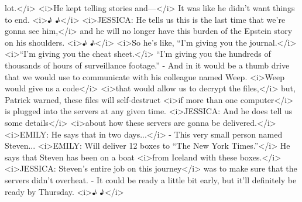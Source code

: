 \begin{itemize}
  lot.\textless{}/i\textgreater{} \textless{}i\textgreater{}He kept
  telling stories and---\textless{}/i\textgreater{} It was like he
  didn't want things to end. \textless{}i\textgreater{}♪
  ♪\textless{}/i\textgreater{} \textless{}i\textgreater{}JESSICA: He
  tells us this is the last time that we're gonna see
  him,\textless{}/i\textgreater{} and he will no longer have this burden
  of the Epstein story on his shoulders. \textless{}i\textgreater{}♪
  ♪\textless{}/i\textgreater{} \textless{}i\textgreater{}So he's like,
  ``I'm giving you the journal.\textless{}/i\textgreater{}
  \textless{}i\textgreater{}``I'm giving you the cheat
  sheet.\textless{}/i\textgreater{} ``I'm giving you the hundreds of
  thousands of hours of surveillance footage.'' - And in it would be a
  thumb drive that we would use to communicate with his colleague named
  Weep. \textless{}i\textgreater{}Weep would give us a
  code\textless{}/i\textgreater{} \textless{}i\textgreater{}that would
  allow us to decrypt the files,\textless{}/i\textgreater{} but, Patrick
  warned, these files will self-destruct \textless{}i\textgreater{}if
  more than one computer\textless{}/i\textgreater{} is plugged into the
  servers at any given time. \textless{}i\textgreater{}JESSICA: And he
  does tell us some details\textless{}/i\textgreater{}
  \textless{}i\textgreater{}about how these servers are gonna be
  delivered.\textless{}/i\textgreater{} \textless{}i\textgreater{}EMILY:
  He says that in two days...\textless{}/i\textgreater{} - This very
  small person named Steven... \textless{}i\textgreater{}EMILY: Will
  deliver 12 boxes to ``The New York Times.''\textless{}/i\textgreater{}
  He says that Steven has been on a boat \textless{}i\textgreater{}from
  Iceland with these boxes.\textless{}/i\textgreater{}
  \textless{}i\textgreater{}JESSICA: Steven's entire job on this
  journey\textless{}/i\textgreater{} was to make sure that the servers
  didn't overheat. - It could be ready a little bit early, but it'll
  definitely be ready by Thursday. \textless{}i\textgreater{}♪
  ♪\textless{}/i\textgreater{}


\end{itemize}
